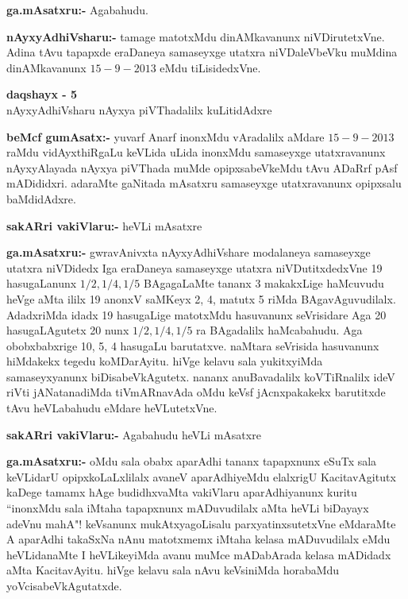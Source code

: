 \smallskip
\noindent
\textbf{ga.mAsatxru:-} Agabahudu.

\smallskip
\noindent
\textbf{nAyxyAdhiVsharu:-} tamage matotxMdu dinAMkavanunx niVDirutetxVne. Adina tAvu tapapxde eraDaneya samaseyxge utatxra niVDaleVbeVku muMdina dinAMkavanunx $15-9-2013$ eMdu tiLisidedxVne.

\begin{center}
{\bf  daqshayx - {\rm 5}}\\
nAyxyAdhiVsharu nAyxya piVThadalilx kuLitidAdxre
\end{center}

\smallskip
\noindent
\textbf{beMcf gumAsatx:-} yuvarf Anarf inonxMdu vAradalilx aMdare $15-9-2013$ raMdu vidAyxthiRgaLu keVLida uLida inonxMdu samaseyxge utatxravanunx nAyxyAlayada nAyxya piVThada muMde opipxsabeVkeMdu tAvu ADaRrf pAsf mADididxri. adaraMte gaNitada mAsatxru samaseyxge utatxravanunx opipxsalu baMdidAdxre.

\smallskip
\noindent
\textbf{sakARri vakiVlaru:-} heVLi mAsatxre

\smallskip
\noindent
\textbf{ga.mAsatxru:-} gwravAnivxta nAyxyAdhiVshare modalaneya samaseyxge utatxra niVDidedx Iga eraDaneya samaseyxge utatxra niVDutitxdedxVne {\rm 19} hasugaLanunx $1/2, 1/4, 1/5$ BAgagaLaMte tananx {\rm 3} makakxLige haMcuvudu heVge aMta ililx {\rm 19} anonxV saMKeyx {\rm 2, 4}, matutx {\rm 5} riMda BAgavAguvudilalx. AdadxriMda idadx {\rm 19} hasugaLige matotxMdu hasuvanunx seVrisidare Aga {\rm 20} hasugaLAgutetx {\rm 20} nunx $1/2, 1/4, 1/5$ ra BAgadalilx haMcabahudu. Aga obobxbabxrige {\rm 10, 5, 4} hasugaLu barutatxve. naMtara seVrisida hasuvanunx hiMdakekx tegedu koMDarAyitu. hiVge kelavu sala yukitxyiMda samaseyxyanunx biDisabeVkAgutetx. nananx anuBavadalilx koVTiRnalilx ideV riVti jANatanadiMda tiVmARnavAda oMdu keVsf jAcnxpakakekx barutitxde tAvu heVLabahudu eMdare heVLutetxVne.

\smallskip
\noindent
\textbf{sakARri vakiVlaru:-} Agabahudu heVLi mAsatxre 

\smallskip
\noindent
\textbf{ga.mAsatxru:-} oMdu sala obabx aparAdhi tananx tapapxnunx eSuTx sala keVLidarU opipxkoLaLxlilalx avaneV aparAdhiyeMdu elalxrigU KacitavAgitutx kaDege tamamx hAge budidhxvaMta vakiVlaru aparAdhiyanunx kuritu ``inonxMdu sala iMtaha tapapxnunx mADuvudilalx aMta heVLi biDayayx adeVnu mahA"! keVsanunx mukAtxyagoLisalu parxyatinxsutetxVne eMdaraMte A aparAdhi takaSxNa nAnu matotxmemx iMtaha kelasa mADuvudilalx eMdu heVLidanaMte  I heVLikeyiMda avanu muMce mADabArada kelasa mADidadx aMta KacitavAyitu. hiVge kelavu sala nAvu keVsiniMda horabaMdu yoVcisabeVkAgutatxde.

